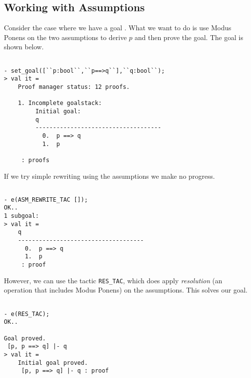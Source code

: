 \subsection{Working with Assumptions}
\label{sec:working-with-assumptions}

Consider the case where we have a goal . What
we want to do is use Modus Ponens on the two assumptions to derive $p$
and then prove the goal. The goal is shown below.

\begin{session}
  \begin{scriptsize}
\begin{verbatim}

- set_goal([``p:bool``,``p==>q``],``q:bool``);
> val it =
    Proof manager status: 12 proofs.
         
    1. Incomplete goalstack:
         Initial goal:
         q
         ------------------------------------
           0.  p ==> q
           1.  p
         
     : proofs
\end{verbatim}
  \end{scriptsize}
\end{session}

If we try simple rewriting using the assumptions we make no progress.
\begin{session}
  \begin{scriptsize}
\begin{verbatim}

- e(ASM_REWRITE_TAC []);
OK..
1 subgoal:
> val it =
    q
    ------------------------------------
      0.  p ==> q
      1.  p
     : proof
\end{verbatim}
  \end{scriptsize}
\end{session}

However, we can use the tactic \verb|RES_TAC|, which does apply
\emph{resolution} (an operation that includes Modus Ponens) on the
assumptions. This solves our goal.

\begin{session}
  \begin{scriptsize}
\begin{verbatim}

- e(RES_TAC);
OK..

Goal proved.
 [p, p ==> q] |- q
> val it =
    Initial goal proved.
     [p, p ==> q] |- q : proof
\end{verbatim}
  \end{scriptsize}
\end{session}


